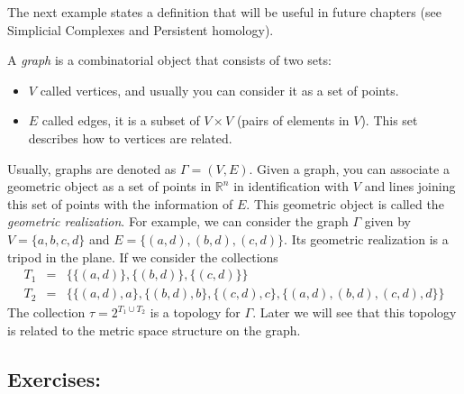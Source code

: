 \documentclass[
	fontsize=10pt, %
	twoside=false, %
	secnumdepth=1, %
]{kaobook}
\begin{document}
The next example states a definition that will be useful in future chapters (see Simplicial Complexes and Persistent homology). 

\begin{example}
A \emph{graph} is a combinatorial object that consists of two sets:
\begin{itemize}
\item $V$ called vertices, and usually you can consider it as a set of points.
\item $E$ called edges, it is a subset of $V\times V$ (pairs of elements in $V$). This set describes how to vertices are related.
\end{itemize}
Usually, graphs are denoted as $\Gamma=(V, E).$ Given a graph, you can associate a geometric object as a set of points in $\mathbb{R}^n$ in identification with $V$ and lines joining this set of points with the information of $E.$ This geometric object is called the \emph{geometric realization}.
For example, we can consider the graph $\Gamma$ given by $V=\{a,b,c,d\}$ and $E=\{(a,d),(b,d),(c,d)\}.$ Its geometric realization is a tripod in the plane. If we consider the collections
\begin{eqnarray*}
T_1 & =& \{\{(a,d)\},\{(b,d)\},\{(c,d)\}\} \\
T_2 & = &\{\{(a,d),a\},\{(b,d),b\},\{(c,d),c\},\{(a,d),(b,d),(c,d),d\}\}
\end{eqnarray*}
The collection $\tau=2^{T_1\cup T_2}$ is a topology for $\Gamma.$ Later we will see that this topology is related to the metric space structure on the graph.
\end{example}

\subsection{Exercises:}
\end{document}
